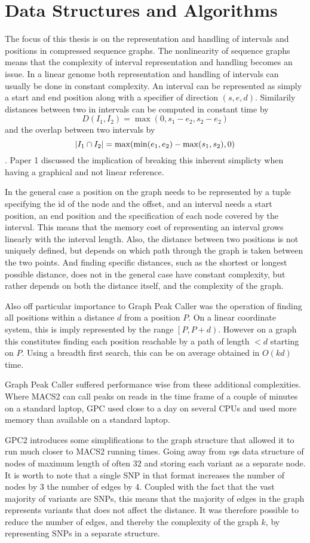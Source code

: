 \section{Data Structures and Algorithms}
The focus of this thesis is on the representation and handling of intervals and positions in compressed sequence graphs.
The nonlinearity of sequence graphs means that the complexity of interval representation and handling becomes an issue.
In a linear genome both representation and handling of intervals can usually be done in constant complexity.
An interval can be represented as simply a start and end position along with a specifier of direction $(s, e, d)$.
Similarily distances between two in intervals can be computed in constant time by
$$D(I_1, I_2) = \max(0, s_1-e_2, s_2-e_2)$$
and the overlap between two intervals by
$$\left|I_1 \cap I_2\right| = \max(\min(e_1, e_2) - \max(s_1, s_2), 0)$$.
Paper 1 discussed the implication of breaking this inherent simplicty when having a graphical and not linear reference.

In the general case a position on the graph needs to be represented by a tuple specifying the id of the node and the offset, and an interval needs a start position, 
an end position and the specification of each node covered by the interval.
This means that the memory cost of representing an interval grows linearly with the interval length.
Also, the distance between two positions is not uniquely defined, but depends on which path through the graph is taken between the two points.
And finding specific distances, such as the shortest or longest possible distance, does not in the general case have constant complexity, but rather depends on both the distance itself, and the complexity of the graph.

Also off particular importance to Graph Peak Caller was the operation of finding all positions within a distance $d$ from a position $P$. On a linear coordinate system, this is imply represented by the range $\left[P, P+d\right)$. However on a graph this constitutes finding each position reachable by a path of length $<d$ starting on $P$. Using a breadth first search, this can be on average obtained in $O(kd)$ time.

Graph Peak Caller suffered performance wise from these additional complexities. Where MACS2 can call peaks on  reads in the time frame of a couple of minutes on a standard laptop, GPC used close to a day on several CPUs and used more memory than available on a standard laptop. 

GPC2 introduces some simplifications to the graph structure that allowed it to run much closer to MACS2 running times.
Going away from \emph{vg}s data structure of nodes of maximum length of often $32$ and storing each variant as a separate node. 
It is worth to note that a single SNP in that format increases the number of nodes by 3 the number of edges by 4.
Coupled with the fact that the vast majority of variants are SNPs, this means that the majority of edges in the graph represents variants that does not affect the distance.
It was therefore possible to reduce the number of edges, and thereby the complexity of the graph $k$, by representing SNPs in a separate structure.

